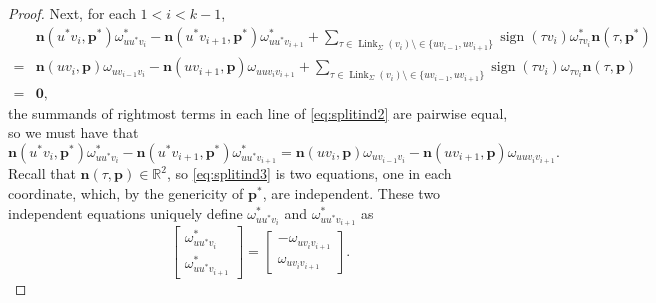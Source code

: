 \documentclass[11pt]{amsart}
\theoremstyle{definition}
\theoremstyle{remark}
\DeclareMathOperator{\sign}{sign}
\DeclareMathOperator{\link}{Link}
\begin{document}
\begin{proof}
    Next, for each $1<i<k-1$,
    \begin{equation}\label{eq:splitind2}
    \begin{split}
        & \mathbf{n}(u^*v_i,\mathbf{p}^*)\omega_{uu^*v_i}^* - \mathbf{n}(u^*v_{i+1},\mathbf{p}^*)\omega_{uu^*v_{i+1}}^* + \sum\limits_{\tau\in\link_{\Sigma}(v_i)\setminus\in\{uv_{i-1},uv_{i+1}\}} \sign(\tau v_i)\omega_{\tau v_i}^*\mathbf{n}(\tau,\mathbf{p}^*) \\
        =& \mathbf{n}(uv_i,\mathbf{p})\omega_{uv_{i-1}v_i} - \mathbf{n}(uv_{i+1},\mathbf{p})\omega_{uuv_iv_{i+1}} + \sum\limits_{\tau\in\link_{\Sigma}(v_i)\setminus\in\{uv_{i-1},uv_{i+1}\}} \sign(\tau v_i)\omega_{\tau v_i}\mathbf{n}(\tau,\mathbf{p}) \\
        =& \mathbf{0},
    \end{split}
    \end{equation}
    the summands of rightmost terms in each line of \cref{eq:splitind2} are pairwise equal, so we must have that
    \begin{equation}\label{eq:splitind3}
        \mathbf{n}(u^*v_i,\mathbf{p}^*)\omega_{uu^*v_i}^* - \mathbf{n}(u^*v_{i+1},\mathbf{p}^*)\omega_{uu^*v_{i+1}}^* = \mathbf{n}(uv_i,\mathbf{p})\omega_{uv_{i-1}v_i} - \mathbf{n}(uv_{i+1},\mathbf{p})\omega_{uuv_iv_{i+1}}.
    \end{equation}
    Recall that $\mathbf{n}(\tau,\mathbf{p})\in\mathbb{R}^2$, so \cref{eq:splitind3} is two equations, one in each coordinate, which, by the genericity of $\mathbf{p}^*$, are independent.
    These two independent equations uniquely define $\omega_{uu^*v_i}^*$ and $\omega_{uu^*v_{i+1}}^*$ as
    \begin{equation}
        \begin{bmatrix}
            \omega_{uu^*v_i}^* \\ \omega_{uu^*v_{i+1}}^*
        \end{bmatrix} = \begin{bmatrix}
            -\omega_{uv_iv_{i+1}} \\ \omega_{uv_iv_{i+1}}
        \end{bmatrix}.
    \end{equation}


\end{proof}
\end{document}
